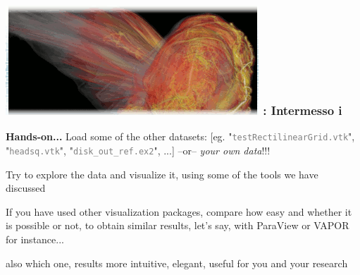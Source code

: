 \handsonEnv
\begin{frame}
\frametitle{\href{https://wci.llnl.gov/simulation/computer-codes/visit/}{\includegraphics[height=.85cm]{figs/visit-logos/VisIt-03}} \hspace{-.85cm}{\bf \textcolor{lightgray}{VisIt}}: Intermesso i}

\begin{beamerboxesrounded}[upper=block head,lower=block body,shadow=true]{\bf Hands-on...}%
        \textcolor{DarkGreen}{} Load some of the other datasets: 
                [eg. {\small "\textcolor{gray}{\texttt{testRectilinearGrid.vtk}}", "\textcolor{gray}{\texttt{headsq.vtk}}", "\textcolor{gray}{\texttt{disk\_out\_ref.ex2}}", ...}]
                --or-- \textit{your own data}!!!

        \pause
        \textcolor{DarkGreen}{} Try to explore the data and visualize it, using some of the tools we have discussed

	\pause
        \textcolor{DarkGreen}{} If you have used other visualization packages, compare how easy and 
                whether it is possible or not, to obtain similar results, let's say, with ParaView or VAPOR for instance...

        \textcolor{DarkGreen}{} also which one, results more intuitive, elegant, useful for you and your research
\end{beamerboxesrounded}


\end{frame}

